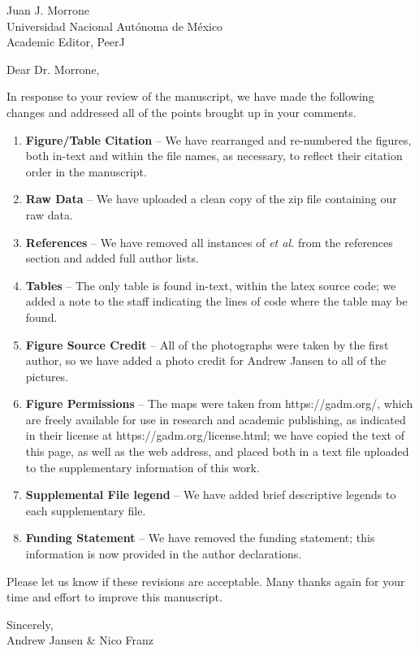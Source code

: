 \documentclass[10pt,letterpaper]{letter}
\begin{document}
 
\begin{letter}{Juan J. Morrone\\Universidad Nacional Aut\'{o}noma de M\'{e}xico\\Academic Editor, PeerJ} 
	\opening{Dear Dr. Morrone,} 

	In response to your review of the manuscript, we have made the following changes and addressed all of the points brought up in your comments.

	\begin{enumerate}
		\item \textbf{Figure/Table Citation} -- We have rearranged and re-numbered the figures, both in-text and within the file names, as necessary, to reflect their citation order in the manuscript.
		\item \textbf{Raw Data} -- We have uploaded a clean copy of the zip file containing our raw data.
		\item \textbf{References} -- We have removed all instances of \textit{et al.} from the references section and added full author lists.
		\item \textbf{Tables} -- The only table is found in-text, within the latex source code; we added a note to the staff indicating the lines of code where the table may be found.
		\item \textbf{Figure Source Credit} -- All of the photographs were taken by the first author, so we have added a photo credit for Andrew Jansen to all of the pictures. 
		\item \textbf{Figure Permissions} -- The maps were taken from https://gadm.org/, which are freely available for use in research and academic publishing, as indicated in their license at https://gadm.org/license.html; we have copied the text of this page, as well as the web address, and placed both in a text file uploaded to the supplementary information of this work.
		\item \textbf{Supplemental File legend} -- We have added brief descriptive legends to each supplementary file.
		\item \textbf{Funding Statement} -- We have removed the funding statement; this information is now provided in the author declarations.
	\end{enumerate}

	Please let us know if these revisions are acceptable.
	Many thanks again for your time and effort to improve this manuscript.

	\closing{Sincerely,\\Andrew Jansen \& Nico Franz}
\end{letter} 
\end{document}
